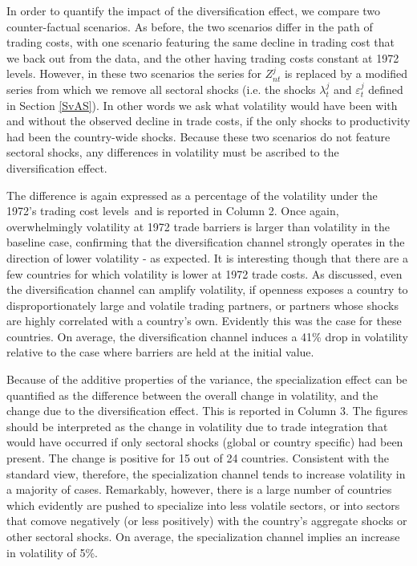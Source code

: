 \documentclass[12pt]{article}
\begin{document}
In order to quantify the impact of the diversification effect, we compare
two counter-factual scenarios. As before, the two scenarios differ in the
path of trading costs, with one scenario featuring the same decline in
trading cost that we back out from the data, and the other having trading
costs constant at 1972 levels. However, in these two scenarios the series
for $Z_{nt}^{j}$ is replaced by a modified series from which we remove all
sectoral shocks (i.e. the shocks $\lambda _{t}^{j}$ and $\varepsilon
_{t}^{j} $ defined in Section \ref{SvAS}). In other words we ask what
volatility would have been with and without the observed decline in trade
costs, if the only shocks to productivity had been the country-wide shocks.
Because these two scenarios do not feature sectoral shocks, any differences
in volatility must be ascribed to the diversification effect.

The difference is again expressed as a percentage of the volatility under
the 1972's trading cost levels\ and is reported in Column 2. Once again,
overwhelmingly volatility at 1972 trade barriers is larger than volatility
in the baseline case, confirming that the diversification channel strongly
operates in the direction of lower volatility - as expected. It is
interesting though that there are a few countries for which volatility is
lower at 1972 trade costs. As discussed, even the diversification channel
can amplify volatility, if openness exposes a country to disproportionately
large and volatile trading partners, or partners whose shocks are highly
correlated with a country's own. Evidently this was the case for these
countries. On average, the diversification channel induces a 41\% drop in
volatility relative to the case where barriers are held at the initial value.

Because of the additive properties of the variance, the specialization
effect can be quantified as the difference between the overall change in
volatility, and the change due to the diversification effect. This is
reported in Column 3. The figures should be interpreted as the change in
volatility due to trade integration that would have occurred if only
sectoral shocks (global or country specific) had been present. The change is
positive for 15 out of 24 countries. Consistent with the standard view,
therefore, the specialization channel tends to increase volatility in a
majority of cases. Remarkably, however, there is a large number of countries
which evidently are pushed to specialize into less volatile sectors, or into
sectors that comove negatively (or less positively) with the country's
aggregate shocks or other sectoral shocks. On average, the specialization
channel implies an increase in volatility of 5\%.
\end{document}
